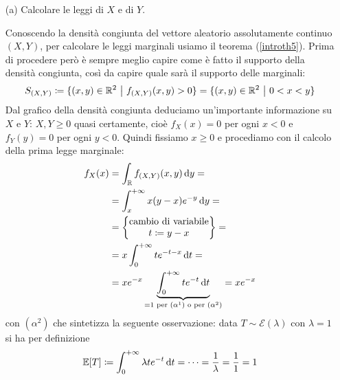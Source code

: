 \Soluzione{}
\begin{enumerate}
\item [(a)] Calcolare le leggi di $X$ e di $Y$.

Conoscendo la densità congiunta del vettore aleatorio assolutamente continuo $(X,Y)$, per calcolare le leggi marginali usiamo il teorema (\ref{introth5}). Prima di procedere però è sempre meglio capire come è fatto il supporto della densità congiunta, così da capire quale sarà il supporto delle marginali:
\[
S_{(X,Y)}\coloneqq\{(x,y)\in\RR^2\ \big|\ \fXYxy>0   \}=\{(x,y)\in\RR^2\ \big|\ 0<x<y   \}
\]
Dal grafico della densità congiunta deduciamo un'importante informazione su $X$ e $Y$: $X,Y\geq 0$ quasi certamente, cioè $f_X(x)=0$ per ogni $x<0$ e $f_Y(y)=0$ per ogni $y<0$. Quindi fissiamo $x\geq 0$ e procediamo con il calcolo della prima legge marginale:
\begin{gather*}
\begin{aligned}
f_X(x)&=\int_{\mathbb{R}} f_{(X,Y)}(x,y)\, \mathrm{d} y= \\
&=\int_x^{+\infty}x(y-x)e^{-y}\, \mathrm{d} y= \\
&=\begin{Bmatrix}
\text{cambio di variabile}\\t\coloneqq y-x 
\end{Bmatrix}= \\
&=x\int_0^{+\infty}te^{-t-x}\, \mathrm{d} t=\\
&=xe^{-x}\underbrace{\int_0^{+\infty}te^{-t}\, \mathrm{d} t}_{=1 \text{ per } (\alpha^1)\text{ o per }(\alpha^2)}=xe^{-x}
\end{aligned}
\end{gather*}
con $(\alpha^2)$ che sintetizza la seguente osservazione: data $T\sim\mathcal{E}(\lambda)$ con $\lambda=1$ si ha per definizione
\begin{equation*}
\mathbb{E}[T]\coloneqq\int_0^{+\infty}\lambda te^{-t}\, \mathrm{d} t=\cdots=\frac{1}{\lambda}=\frac{1}{1}=1
\end{equation*}


\end{enumerate}
